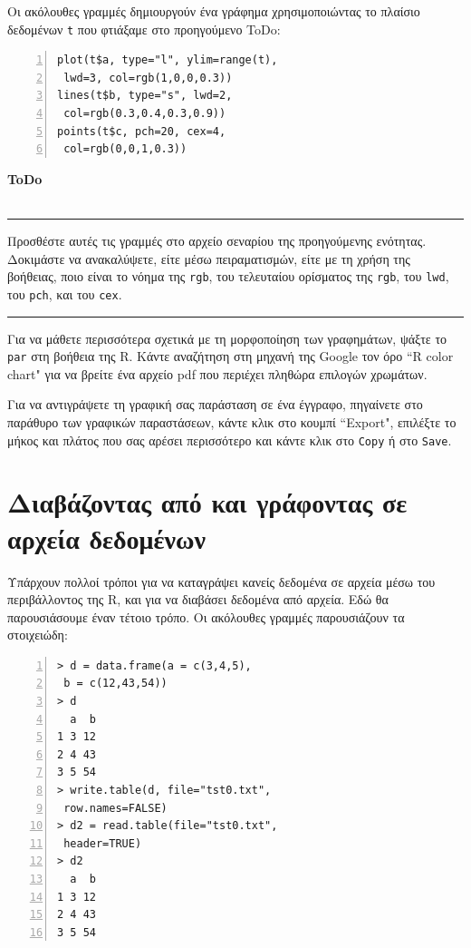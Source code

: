 \documentclass[a4paper,10pt,twocolumn]{article}
\newenvironment{ToDo} {
  \begin{flushright}
    \hfill
    \begin{minipage}{0.9\columnwidth}
    \textsf{\textbf{ToDo}} \\
      \vspace{-0.7cm}\\
      {\color{Gray}\rule[-0.05cm]{\columnwidth}{1.5pt}}} {
      {\color{Gray}\rule[0.3cm]{\columnwidth}{1.5pt}}
    \end{minipage}
    \vspace{0.3cm}
  \end{flushright}
  }
\begin{document}
\noindent Οι ακόλουθες γραμμές δημιουργούν ένα γράφημα χρησιμοποιώντας το πλαίσιο δεδομένων \texttt{t} που 
φτιάξαμε στο προηγούμενο ToDo:

\begin{Verbatim}[frame=single,numbers=left,gobble=0, xleftmargin=0.35cm, numbersep=0.1cm]
plot(t$a, type="l", ylim=range(t), 
 lwd=3, col=rgb(1,0,0,0.3))
lines(t$b, type="s", lwd=2, 
 col=rgb(0.3,0.4,0.3,0.9))
points(t$c, pch=20, cex=4, 
 col=rgb(0,0,1,0.3))
\end{Verbatim} 

\begin{ToDo}
Προσθέστε αυτές τις γραμμές στο αρχείο σεναρίου της προηγούμενης ενότητας. Δοκιμάστε να ανακαλύψετε, είτε 
μέσω πειραματισμών, είτε με τη χρήση της βοήθειας, ποιο είναι το νόημα της \texttt{rgb}, του τελευταίου
ορίσματος της \texttt{rgb}, του \texttt{lwd}, του \texttt{pch}, και του \texttt{cex}.\\
\end{ToDo}

Για να μάθετε περισσότερα σχετικά με τη μορφοποίηση των γραφημάτων, ψάξτε το \texttt{par} στη βοήθεια της R.
Κάντε αναζήτηση στη μηχανή της Google τον όρο ``R color chart" για να βρείτε ένα αρχείο pdf που περιέχει
πληθώρα επιλογών χρωμάτων.

Για να αντιγράψετε τη γραφική σας παράσταση σε ένα έγγραφο, πηγαίνετε στο παράθυρο των γραφικών παραστάσεων,
κάντε κλικ στο κουμπί ``Export", επιλέξτε το μήκος και πλάτος που σας αρέσει περισσότερο και κάντε κλικ στο
\texttt{Copy} ή στο \texttt{Save}. 


\section{Διαβάζοντας από και γράφοντας σε αρχεία δεδομένων}
\label{sec:reading-writing-data}

Υπάρχουν πολλοί τρόποι για να καταγράψει κανείς δεδομένα σε αρχεία μέσω του περιβάλλοντος της R, και για να 
διαβάσει δεδομένα από αρχεία. Εδώ θα παρουσιάσουμε έναν τέτοιο τρόπο. Οι ακόλουθες γραμμές παρουσιάζουν τα
στοιχειώδη:

\begin{Verbatim}[frame=single,numbers=left,gobble=0, xleftmargin=0.35cm, numbersep=0.1cm]
> d = data.frame(a = c(3,4,5), 
 b = c(12,43,54))
> d
  a  b
1 3 12
2 4 43
3 5 54
> write.table(d, file="tst0.txt",
 row.names=FALSE)
> d2 = read.table(file="tst0.txt", 
 header=TRUE)
> d2
  a  b
1 3 12
2 4 43
3 5 54
\end{Verbatim}
\end{document}
